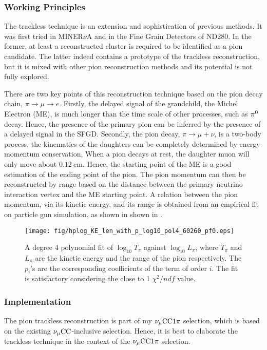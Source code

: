        \subsubsection{Working Principles}
         The trackless technique is an extension and sophistication of previous methods. 
         It was first tried in MINER$\nu$A\cite{MINERVAPOSTER} and in the Fine Grain Detectors of ND280\cite{T2KPOSTER}. 
         In the former, at least a reconstructed cluster is required to be identified as a pion candidate. 
         The latter indeed contains a prototype of the trackless reconstruction, but it is mixed with other pion reconstruction methods and its potential is not fully explored. 
    
         There are two key points of this reconstruction technique based on the pion decay chain, $\pi \rightarrow \mu \rightarrow e$.
         Firstly, the delayed signal of the grandchild, the Michel Electron (ME), is much longer than the time scale of other processes, such as $\pi^0$ decay.
         Hence, the presence of the primary pion can be inferred by the presence of a delayed signal in the SFGD.
         Secondly, the pion decay, $\pi \rightarrow \mu + \nu$, is a two-body process, the kinematics of the daughters can be completely determined by energy-momentum conservation, 
         When a pion decays at rest, the daughter muon will only move about $0.12~\textrm{cm}$. Hence, the starting point of the ME is a good estimation of the ending point of the pion.
         The pion momentum can then be reconstructed by range based on the distance between the primary neutrino interaction vertex and the ME starting point. 
         A relation between the pion momentum, via its kinetic energy, and its range is obtained from an empirical fit on particle gun simulation, as shown in shown in .
        
           \begin{figure}[h]
              \centering
              \texttt{[image: fig/hplog\_KE\_len\_with\_p\_log10\_pol4\_60260\_pf0.eps]} 
              \caption{A degree 4 polynomial fit of $\log_{10}{T_\pi}$ against $\log_{10}{L_\pi}$, where $T_\pi$ and $L_\pi$ are the kinetic energy and the range of the pion respectively. The $p_i$'s are the corresponding coefficients of the term of order $i$. The fit is satisfactory considering the close to 1 $\chi^2/ndf$ value. }
              \label{fig:fit}
           \end{figure}

        \subsubsection{Implementation}
            The pion trackless reconstruction is part of my $\nu_{\mu}\textrm{CC}1\pi$ selection, which is based on the existing $\nu_{\mu}\textrm{CC}$-inclusive selection. Hence, it is best to elaborate the trackless technique in the context of the $\nu_{\mu}\textrm{CC}1\pi$ selection. 
        
